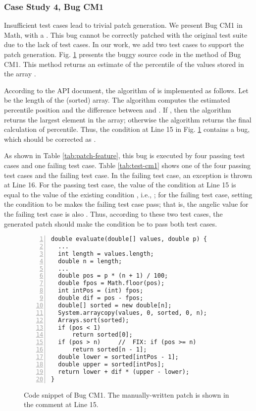 \subsubsection{Case Study 4, Bug CM1}
\label{subsubsect:bug-cm1}

Insufficient test cases lead to trivial patch generation. 
We present Bug CM1 in Math, with a \buggycondition. This bug cannot be correctly patched with the original test suite due to the lack of test cases. In our work, we add two test cases to support the patch generation. 
Fig. \ref{fig:bug-cm1} presents the buggy source code in the method  of Bug CM1. This method returns an estimate of the percentile  of the values stored in the array . 

According to the API document, the algorithm of  is implemented as follows. 
Let  be the length of the (sorted) array. The algorithm computes the estimated percentile position  and the difference  between  and . If , then the algorithm returns the largest element in the array; otherwise the algorithm returns the final calculation of percentile. Thus, the condition at Line 15 in Fig. \ref{fig:bug-cm1} contains a bug, which should be corrected as . 

As shown in Table \ref{tab:patch-feature}, this bug is executed by four passing test cases and one failing test case. Table \ref{tab:test-cm1} shows one of the four passing test cases and the failing test case. In the failing test case, an  exception is thrown at Line 16. For the passing test case, the value of the condition at Line 15 is equal to the value of the existing condition , i.e., ; for the failing test case, setting the condition to be  makes the failing test case pass; that is, the angelic value for the failing test case is also . Thus, according to these two test cases, the generated patch should make the condition be  to pass both test cases. 

\begin{figure}[!t]
\centering
\noindent\begin{minipage}{0.4\textwidth}
\begin{lstlisting}[numbers=left]
double evaluate(double[] values, double p) {
  ...
  int length = values.length;
  double n = length;
  ...
  double pos = p * (n + 1) / 100;
  double fpos = Math.floor(pos);
  int intPos = (int) fpos;
  double dif = pos - fpos;
  double[] sorted = new double[n];
  System.arraycopy(values, 0, sorted, 0, n);
  Arrays.sort(sorted);
  if (pos < 1) 
      return sorted[0];   
  if (pos > n)     //  FIX: if (pos >= n) 
      return sorted[n - 1];    
  double lower = sorted[intPos - 1];
  double upper = sorted[intPos];
  return lower + dif * (upper - lower);
}
\end{lstlisting}

\end{minipage}
\caption{Code snippet of Bug CM1. The manually-written patch is shown in the  comment at Line 15.}
\label{fig:bug-cm1}
\end{figure}

